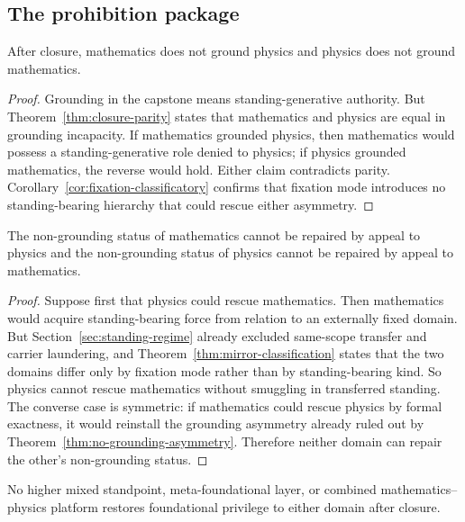 \subsection{The prohibition package}

\begin{theorem}
\label{thm:no-grounding-asymmetry}
After closure, mathematics does not ground physics and physics does not ground mathematics.
\end{theorem}

\begin{proof}
Grounding in the capstone means standing-generative authority. But Theorem~\ref{thm:closure-parity} states that mathematics and physics are equal in grounding incapacity. If mathematics grounded physics, then mathematics would possess a standing-generative role denied to physics; if physics grounded mathematics, the reverse would hold. Either claim contradicts parity. Corollary~\ref{cor:fixation-classificatory} confirms that fixation mode introduces no standing-bearing hierarchy that could rescue either asymmetry.
\end{proof}

\begin{theorem}
\label{thm:no-cross-domain-rescue}
The non-grounding status of mathematics cannot be repaired by appeal to physics and the non-grounding status of physics cannot be repaired by appeal to mathematics.
\end{theorem}

\begin{proof}
Suppose first that physics could rescue mathematics. Then mathematics would acquire standing-bearing force from relation to an externally fixed domain. But Section~\ref{sec:standing-regime} already excluded same-scope transfer and carrier laundering, and Theorem~\ref{thm:mirror-classification} states that the two domains differ only by fixation mode rather than by standing-bearing kind. So physics cannot rescue mathematics without smuggling in transferred standing. The converse case is symmetric: if mathematics could rescue physics by formal exactness, it would reinstall the grounding asymmetry already ruled out by Theorem~\ref{thm:no-grounding-asymmetry}. Therefore neither domain can repair the other's non-grounding status.
\end{proof}

\begin{theorem}
\label{thm:no-meta-reescalation}
No higher mixed standpoint, meta-foundational layer, or combined mathematics--physics platform restores foundational privilege to either domain after closure.
\end{theorem}

